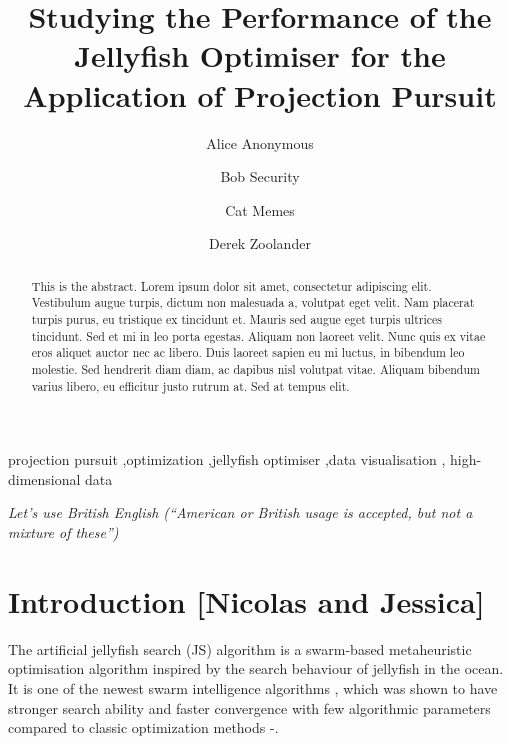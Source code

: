 \documentclass[
  number,
  preprint,
  3p]{elsarticle}
\begin{document}
\begin{frontmatter}
\title{Studying the Performance of the Jellyfish Optimiser for the
Application of Projection Pursuit}
\author[1]{Alice Anonymous%
%
}
\author[2]{Bob Security%
%
}
\author[2]{Cat Memes%
%
}
\author[]{Derek Zoolander%
%
}






        
\begin{abstract}
This is the abstract. Lorem ipsum dolor sit amet, consectetur adipiscing
elit. Vestibulum augue turpis, dictum non malesuada a, volutpat eget
velit. Nam placerat turpis purus, eu tristique ex tincidunt et. Mauris
sed augue eget turpis ultrices tincidunt. Sed et mi in leo porta
egestas. Aliquam non laoreet velit. Nunc quis ex vitae eros aliquet
auctor nec ac libero. Duis laoreet sapien eu mi luctus, in bibendum leo
molestie. Sed hendrerit diam diam, ac dapibus nisl volutpat vitae.
Aliquam bibendum varius libero, eu efficitur justo rutrum at. Sed at
tempus elit.
\end{abstract}





\begin{keyword}
    projection pursuit \sep optimization \sep jellyfish
optimiser \sep data visualisation \sep 
    high-dimensional data
\end{keyword}
\end{frontmatter}
    
\emph{Let's use British English (``American or British usage is
accepted, but not a mixture of these'')}

\section{Introduction {[}Nicolas and
Jessica{]}}\label{introduction-nicolas-and-jessica}

The artificial jellyfish search (JS) algorithm \citep{chou_novel_2021}
is a swarm-based metaheuristic optimisation algorithm inspired by the
search behaviour of jellyfish in the ocean. It is one of the newest
swarm intelligence algorithms \citep{rajwar_exhaustive_2023}, which was
shown to have stronger search ability and faster convergence with few
algorithmic parameters compared to classic optimization methods
\citep{chou_novel_2021}-\citep{chou_recent_2022}.
\end{document}
